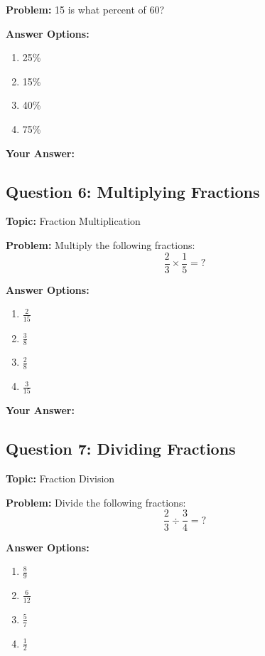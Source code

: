 \documentclass[12pt]{article}
\begin{document}
\textbf{Problem:} 15 is what percent of 60?

\textbf{Answer Options:}
\begin{enumerate}[label=\Alph*)]
    \item 25\%
    \item 15\%
    \item 40\%
    \item 75\%
\end{enumerate}

\noindent\textbf{Your Answer:} \underline{\hspace{2cm}}

\vspace{0.5cm}


\subsection{Question 6: Multiplying Fractions}
\textbf{Topic:} Fraction Multiplication

\textbf{Problem:} Multiply the following fractions:
\[\frac{2}{3} \times \frac{1}{5} = ?\]

\textbf{Answer Options:}
\begin{enumerate}[label=\Alph*)]
    \item $\frac{2}{15}$
    \item $\frac{3}{8}$
    \item $\frac{2}{8}$
    \item $\frac{3}{15}$
\end{enumerate}

\noindent\textbf{Your Answer:} \underline{\hspace{2cm}}

\vspace{0.5cm}


\subsection{Question 7: Dividing Fractions}
\textbf{Topic:} Fraction Division

\textbf{Problem:} Divide the following fractions:
\[\frac{2}{3} \div \frac{3}{4} = ?\]

\textbf{Answer Options:}
\begin{enumerate}[label=\Alph*)]
    \item $\frac{8}{9}$
    \item $\frac{6}{12}$
    \item $\frac{5}{7}$
    \item $\frac{1}{2}$
\end{enumerate}
\end{document}
